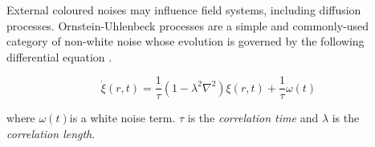 External coloured noises may influence field systems, including diffusion
processes. Ornstein-Uhlenbeck processes are a simple and commonly-used
category of non-white noise whose evolution is governed by the following
differential equation \cite{ojalvoColoredNoise}.

\[\dot{\xi}(r,t) = \frac{1}{\tau}(1 - \lambda^{2}\nabla^{2})\xi(r,t) + \frac{1}{\tau}\omega(t)\]

where \(\omega(t)\)is a white noise term. \(\tau\) is the
\emph{correlation time} and \(\lambda\) is the \emph{correlation length}.